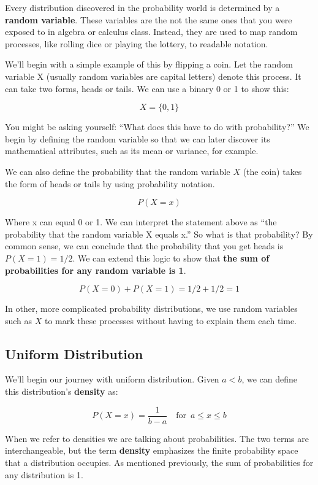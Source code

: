 \documentclass[
]{article}
\begin{document}
Every distribution discovered in the probability world is determined by a \textbf{random variable}. These variables are the not the same ones that you were exposed to in algebra or calculus class. Instead, they are used to map random processes, like rolling dice or playing the lottery, to readable notation.

We'll begin with a simple example of this by flipping a coin. Let the random variable X (usually random variables are capital letters) denote this process. It can take two forms, heads or tails. We can use a binary 0 or 1 to show this:

\[X = \{0,1\}\]

You might be asking yourself: ``What does this have to do with probability?'' We begin by defining the random variable so that we can later discover its mathematical attributes, such as its mean or variance, for example.

We can also define the probability that the random variable \(X\) (the coin) takes the form of heads or tails by using probability notation.

\[P(X = x)\]

Where x can equal 0 or 1. We can interpret the statement above as ``the probability that the random variable X equals x.'' So what is that probability? By common sense, we can conclude that the probability that you get heads is \(P(X=1)=1/2\). We can extend this logic to show that \textbf{the sum of probabilities for any random variable is 1}.

\[P(X = 0) + P(X = 1)= 1/2 + 1/2 = 1\]

In other, more complicated probability distributions, we use random variables such as \(X\) to mark these processes without having to explain them each time.

\hypertarget{Uniform}{%
\subsection{Uniform Distribution}\label{Uniform}}

We'll begin our journey with uniform distribution. Given \(a < b\), we can define this distribution's \textbf{density} as:

\[ P(X=x) = \frac{1}{b-a}\quad \textrm{for} \enspace a \leq x \leq b \]

When we refer to densities we are talking about probabilities. The two terms are interchangeable, but the term \textbf{density} emphasizes the finite probability space that a distribution occupies. As mentioned previously, the sum of probabilities for any distribution is 1.
\end{document}
